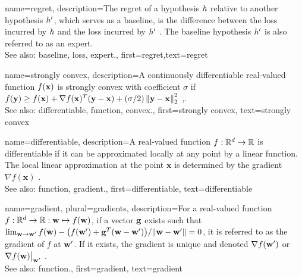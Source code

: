 {name={regret},
	description={The regret of a \gls{hypothesis} $h$ relative to 
		another \gls{hypothesis} $h'$, which serves as a \gls{baseline}, 
		is the difference between the \gls{loss} incurred by $h$ and the \gls{loss} 
		incurred by $h'$ \cite{PredictionLearningGames}. 
		The \gls{baseline} \gls{hypothesis} $h'$ is also referred to as an \gls{expert}.
					\\ 
		See also: \gls{baseline}, \gls{loss}, \gls{expert}.},
	first={regret},text={regret} 
}

{name={strongly convex},
	description={A continuously \gls{differentiable} real-valued 
		\gls{function} $f({\bf x})$ is strongly \gls{convex} with coefficient $\sigma$ if $f({\bf y}) \geq f({\bf x}) + \nabla f({\bf x})^{T} ({\bf y} - {\bf x}) + (\sigma/2) \left\Vert {{\bf y}- {\bf x}} \right\Vert_{2}^{2}$ \cite{nesterov04},\cite[Sec. B.1.1]{CvxAlgBertsekas}.
					\\ 
		See also: \gls{differentiable}, \gls{function}, \gls{convex}.},
	first={strongly convex},
	text={strongly convex} 
}

{name={differentiable},
	description={A real-valued \gls{function} $f: \mathbb{R}^{d} \rightarrow \mathbb{R}$ 
		is differentiable if it can be approximated locally at any point by a linear \gls{function}. 
		The local linear approximation at the point $\mathbf{x}$ is determined 
		by the \gls{gradient} $\nabla f ( \mathbf{x})$ \cite{RudinBookPrinciplesMatheAnalysis}.
					\\ 
		See also: \gls{function}, \gls{gradient}.},
	first={differentiable},
	text={differentiable} 
}

{name={gradient}, plural={gradients},
	description={For a real-valued \gls{function} 
		$f: \mathbb{R}^{d} \rightarrow \mathbb{R}: {\bf w} \mapsto f({\bf w})$, 
		if a vector ${\bf g}$ exists such that 
		$\lim_{{\bf w} \rightarrow {\bf w}'} {f({\bf w}) - \big(f({\bf w}') + {\bf g}^{T} ({\bf w} - {\bf w}') \big) }/{\| {\bf w} - {\bf w}'\|}=0$, 
		it is referred to as the gradient of $f$ at ${\bf w}'$. If it exists, the gradient is unique and 
		denoted $\nabla f({\bf w}')$ or $\nabla f({\bf w})\big|_{{\bf w}'}$ \cite{RudinBookPrinciplesMatheAnalysis}.
		\\
		See also: \gls{function}.},
	first={gradient},
	text={gradient} 
}

